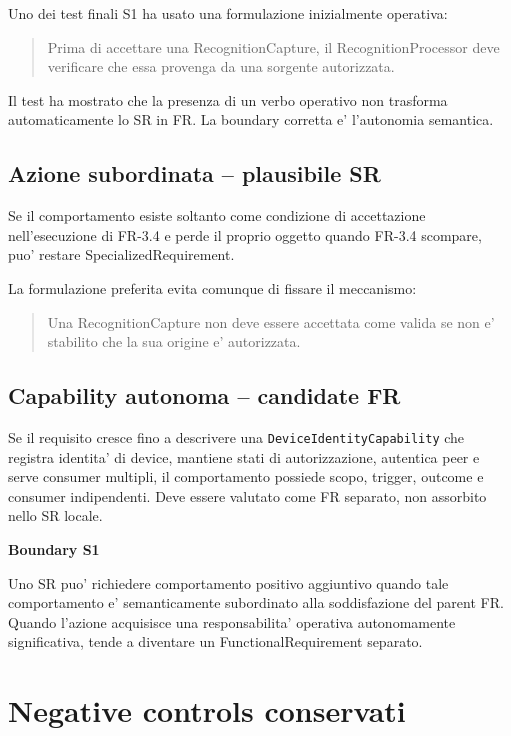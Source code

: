 \documentclass[11pt,a4paper]{article}
\newenvironment{statusbox}[1]{%
  \def\FrameCommand{\fcolorbox{ddtablue}{ddtagray}}%
  \MakeFramed{\advance\hsize-2\width\FrameRestore}
  \noindent\textbf{#1}\par\smallskip
}{\endMakeFramed}
\begin{document}
Uno dei test finali S1 ha usato una formulazione inizialmente operativa:

\begin{quote}
Prima di accettare una RecognitionCapture, il RecognitionProcessor deve verificare che essa provenga da una sorgente autorizzata.
\end{quote}

Il test ha mostrato che la presenza di un verbo operativo non trasforma automaticamente lo SR in FR. La boundary corretta e' l'autonomia semantica.

\subsection{Azione subordinata -- plausibile SR}

Se il comportamento esiste soltanto come condizione di accettazione nell'esecuzione di FR-3.4 e perde il proprio oggetto quando FR-3.4 scompare, puo' restare SpecializedRequirement.

La formulazione preferita evita comunque di fissare il meccanismo:

\begin{quote}
Una RecognitionCapture non deve essere accettata come valida se non e' stabilito che la sua origine e' autorizzata.
\end{quote}

\subsection{Capability autonoma -- candidate FR}

Se il requisito cresce fino a descrivere una \texttt{DeviceIdentityCapability} che registra identita' di device, mantiene stati di autorizzazione, autentica peer e serve consumer multipli, il comportamento possiede scopo, trigger, outcome e consumer indipendenti. Deve essere valutato come FR separato, non assorbito nello SR locale.

\begin{statusbox}{Boundary S1}
Uno SR puo' richiedere comportamento positivo aggiuntivo quando tale comportamento e' semanticamente subordinato alla soddisfazione del parent FR. Quando l'azione acquisisce una responsabilita' operativa autonomamente significativa, tende a diventare un FunctionalRequirement separato.
\end{statusbox}

\section{Negative controls conservati}
\end{document}
